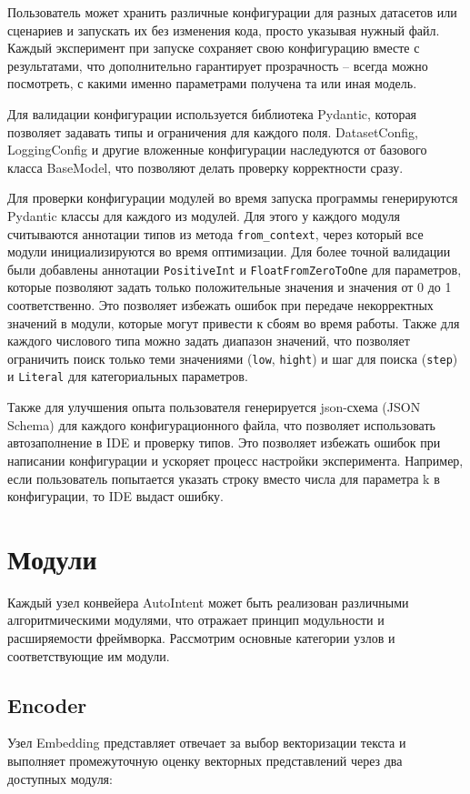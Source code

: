 \documentclass[14pt,a4paper,oneside,openany]{extbook}
\begin{document}
Пользователь может хранить различные конфигурации для разных датасетов или сценариев и запускать их без изменения кода, просто указывая нужный файл. Каждый эксперимент при запуске сохраняет свою конфигурацию вместе с результатами, что дополнительно гарантирует прозрачность – всегда можно посмотреть, с какими именно параметрами получена та или иная модель.

Для валидации конфигурации используется библиотека Pydantic, которая позволяет задавать типы и ограничения для каждого поля. DatasetConfig, LoggingConfig и другие вложенные конфигурации наследуются от базового класса BaseModel, что позволяют делать проверку корректности сразу.

Для проверки конфигурации модулей во время запуска программы генерируются Pydantic классы для каждого из модулей. Для этого у каждого модуля считываются аннотации типов из метода \texttt{from\_context}, через который все модули инициализируются во время оптимизации. Для более точной валидации были добавлены аннотации \texttt{PositiveInt} и \texttt{FloatFromZeroToOne} для параметров, которые позволяют задать только положительные значения и значения от 0 до 1 соответственно. Это позволяет избежать ошибок при передаче некорректных значений в модули, которые могут привести к сбоям во время работы. Также для каждого числового типа можно задать диапазон значений, что позволяет ограничить поиск только теми значениями (\texttt{low}, \texttt{hight}) и шаг для поиска (\texttt{step}) и \texttt{Literal} для категориальных параметров.

Также для улучшения опыта пользователя генерируется json-схема (JSON Schema) для каждого конфигурационного файла, что позволяет использовать автозаполнение в IDE и проверку типов. Это позволяет избежать ошибок при написании конфигурации и ускоряет процесс настройки эксперимента. Например, если пользователь попытается указать строку вместо числа для параметра k в конфигурации, то IDE выдаст ошибку.
\section{Модули}
\label{sec:org071c7db}
Каждый узел конвейера AutoIntent может быть реализован различными алгоритмическими модулями, что отражает принцип модульности и расширяемости фреймворка. Рассмотрим основные категории узлов и соответствующие им модули.
\subsection{Encoder}
\label{sec:org60bdc1a}
Узел Embedding представляет отвечает за выбор векторизации текста и выполняет промежуточную оценку векторных представлений через два доступных модуля:
\end{document}
